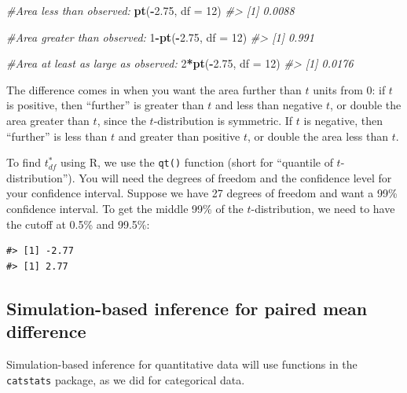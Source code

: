 \documentclass[
  10pt,
  openany]{book}
\newenvironment{Shaded}{\begin{snugshade}}{\end{snugshade}}
\newcommand{\AttributeTok}[1]{\textcolor[rgb]{0.13,0.29,0.53}{#1}}
\newcommand{\CommentTok}[1]{\textcolor[rgb]{0.56,0.35,0.01}{\textit{#1}}}
\newcommand{\DecValTok}[1]{\textcolor[rgb]{0.00,0.00,0.81}{#1}}
\newcommand{\FloatTok}[1]{\textcolor[rgb]{0.00,0.00,0.81}{#1}}
\newcommand{\FunctionTok}[1]{\textcolor[rgb]{0.13,0.29,0.53}{\textbf{#1}}}
\newcommand{\NormalTok}[1]{#1}
\newcommand{\SpecialCharTok}[1]{\textcolor[rgb]{0.81,0.36,0.00}{\textbf{#1}}}
\theoremstyle{definition}
\theoremstyle{definition}
\theoremstyle{definition}
\theoremstyle{definition}
\theoremstyle{remark}
\begin{document}
\begin{Shaded}
\begin{Highlighting}[]
\CommentTok{\#Area less than observed:}
\FunctionTok{pt}\NormalTok{(}\SpecialCharTok{{-}}\FloatTok{2.75}\NormalTok{, }\AttributeTok{df =} \DecValTok{12}\NormalTok{)}
\CommentTok{\#\textgreater{} [1] 0.0088}

\CommentTok{\#Area greater than observed:}
\DecValTok{1}\SpecialCharTok{{-}}\FunctionTok{pt}\NormalTok{(}\SpecialCharTok{{-}}\FloatTok{2.75}\NormalTok{, }\AttributeTok{df =} \DecValTok{12}\NormalTok{)}
\CommentTok{\#\textgreater{} [1] 0.991}

\CommentTok{\#Area at least as large as observed:}
\DecValTok{2}\SpecialCharTok{*}\FunctionTok{pt}\NormalTok{(}\SpecialCharTok{{-}}\FloatTok{2.75}\NormalTok{, }\AttributeTok{df =} \DecValTok{12}\NormalTok{)}
\CommentTok{\#\textgreater{} [1] 0.0176}
\end{Highlighting}
\end{Shaded}

The difference comes in when you want the area further than \(t\) units from 0: if \(t\) is positive, then ``further'' is greater than \(t\) and less than negative \(t\), or double the area greater than \(t\), since the \(t\)-distribution is symmetric. If \(t\) is negative, then ``further'' is less than \(t\) and greater than positive \(t\), or double the area less than \(t\).

To find \(t^*_{df}\) using R, we use the \texttt{qt()} function (short for ``quantile of \(t\)-distribution''). You will need the degrees of freedom and the confidence level for your confidence interval. Suppose we have 27 degrees of freedom and want a 99\% confidence interval. To get the middle 99\% of the \(t\)-distribution, we need to have the cutoff at 0.5\% and 99.5\%:

\begin{verbatim}
#> [1] -2.77
#> [1] 2.77
\end{verbatim}

\subsection*{Simulation-based inference for paired mean difference}\label{simulation-based-inference-for-paired-mean-difference}

Simulation-based inference for quantitative data will use functions in the \texttt{catstats} package, as we did for categorical data.
\end{document}
